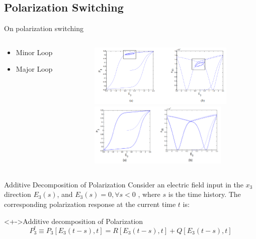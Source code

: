 \documentclass{beamer}
\begin{document}
\subsection{Polarization Switching}

\begin{frame}{On polarization switching}
     \begin{columns}[t]
     \begin{column}[T]{5cm}
       \begin{itemize} \itemsep15ex
  \item  Minor Loop 
  
  \item  Major Loop
  \end{itemize} 
     \end{column}
     \begin{column}[T]{10cm} %
      \includegraphics[height=3cm]{../images/Miror_Loop_Hystersis_Response}\\
       \includegraphics[height=3cm]{../images/Major_Loop_Hystersis_Response}\\
     \end{column}
     \end{columns}    
\end{frame}

\begin{frame}{Additive Decomposition of Polarization}
Consider an electric field input in the $x_3$ direction $E_3(s)$, and $E_3(s)=0,\forall s<0$  , where $s$ is the time history.  The corresponding polarization response at the current time $t$ is:
\begin{block}<+->{Additive decomposition of Polarization}
\begin{equation}
P_3^t\equiv P_3[E_3(t-s),t]=R[E_3(t-s),t]+Q[E_3(t-s),t]
\label{EQN:PolRQ}
\end{equation}
\end{block} 
\end{frame}
\end{document}
